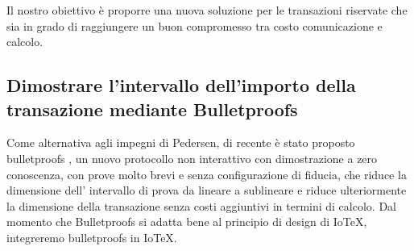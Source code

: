 Il nostro obiettivo è proporre una nuova soluzione per le transazioni riservate che sia in grado di raggiungere un buon compromesso tra costo comunicazione e calcolo.

\subsection{Dimostrare l'intervallo dell'importo della transazione mediante Bulletproofs}
Come alternativa agli impegni di Pedersen, di recente è stato proposto bulletproofs \cite{c5}, un nuovo protocollo non interattivo con dimostrazione a zero conoscenza, con prove molto brevi e senza configurazione di fiducia, che riduce la dimensione dell' intervallo di prova da lineare a sublineare e riduce ulteriormente la dimensione della transazione senza costi aggiuntivi in termini di calcolo. Dal momento che  Bulletproofs si adatta bene al principio di design di IoTeX, integreremo bulletproofs in IoTeX.